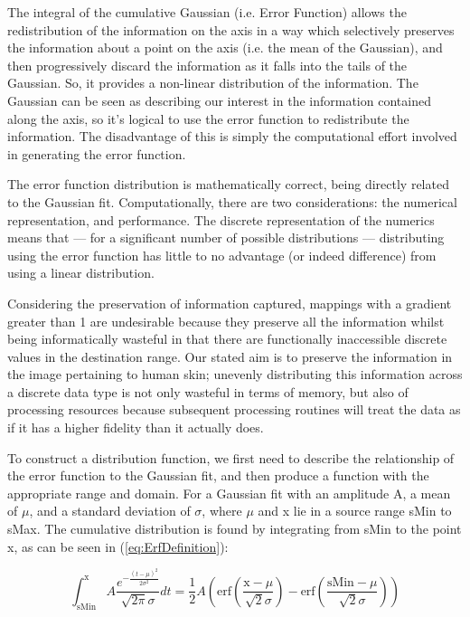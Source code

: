 The integral of the cumulative Gaussian (i.e. Error Function) allows the redistribution of the information on the axis in a way which selectively preserves the information about a point on the axis (i.e. the mean of the Gaussian), and then progressively discard the information as it falls into the tails of the Gaussian. So, it provides a non-linear distribution of the information. The Gaussian can be seen as describing our interest in the information contained along the axis, so it's logical to use the error function to redistribute the information. The disadvantage of this is simply the computational effort involved in generating the error function.

The error function distribution is mathematically correct, being directly related to the Gaussian fit. Computationally, there are two considerations: the numerical representation, and performance. The discrete representation of the numerics means that --- for a significant number of possible distributions --- distributing using the error function has little to no advantage (or indeed difference) from using a linear distribution.

Considering the preservation of information captured, mappings with a gradient greater than 1 are undesirable because they preserve all the information whilst being informatically wasteful in that there are functionally inaccessible discrete values in the destination range. Our stated aim is to preserve the information in the image pertaining to human skin; unevenly distributing this information across a discrete data type is not only wasteful in terms of memory, but also of processing resources because subsequent processing routines will treat the data as if it has a higher fidelity than it actually does.

To construct a distribution function, we first need to describe the relationship of the error function to the Gaussian fit, and then produce a function with the appropriate range and domain. For a Gaussian fit with an amplitude A, a mean of $\mu$, and a standard deviation of $\sigma$, where $\mu$ and x lie in a source range sMin to sMax. The cumulative distribution is found by integrating from sMin to the point x, as can be seen in (\ref{eq:ErfDefinition}):

\begin{equation}\label{eq:ErfDefinition}
  \int _{\text{sMin}}^{\text{x}} A \frac{e^{-\frac{(t-\mu )^2}{2 \sigma ^2}}}{\sqrt{2 \pi } \sigma }dt=\frac{1}{2} A \left(\text{erf}\left(\frac{\text{x}-\mu }{\sqrt{2} \sigma }\right)-\text{erf}\left(\frac{\text{sMin}-\mu }{\sqrt{2} \sigma }\right)\right)
\end{equation}

